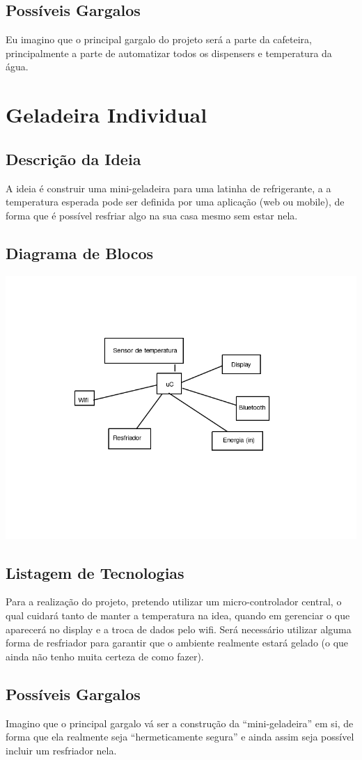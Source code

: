 \documentclass[11pt]{article}
\begin{document}
\subsection{Possíveis Gargalos}
\label{sec:orgheadline4}
Eu imagino que o principal gargalo do projeto será a parte da cafeteira,
principalmente a parte de automatizar todos os dispensers e temperatura da
água.

\section{Geladeira Individual}
\subsection{Descrição da Ideia}
\label{sec:orgheadline6}
A ideia é construir uma mini-geladeira para uma latinha de refrigerante, a
a temperatura esperada pode ser definida por uma aplicação (web ou mobile), de
forma que é possível resfriar algo na sua casa mesmo sem estar nela.
\subsection{Diagrama de Blocos}
\label{sec:orgheadline7}
\includegraphics[width=\textwidth]{diagrama-refri}
\subsection{Listagem de Tecnologias}
\label{sec:orgheadline8}
Para a realização do projeto, pretendo utilizar um micro-controlador central, o
qual cuidará tanto de manter a temperatura na idea, quando em gerenciar o que
aparecerá no display e a troca de dados pelo wifi. Será necessário utilizar
alguma forma de resfriador para garantir que o ambiente realmente estará gelado
(o que ainda não tenho muita certeza de como fazer).
\subsection{Possíveis Gargalos}
\label{sec:orgheadline9}
Imagino que o principal gargalo vá ser a construção da ``mini-geladeira'' em si,
de forma que ela realmente seja ``hermeticamente segura'' e ainda assim seja
possível incluir um resfriador nela.
\end{document}
